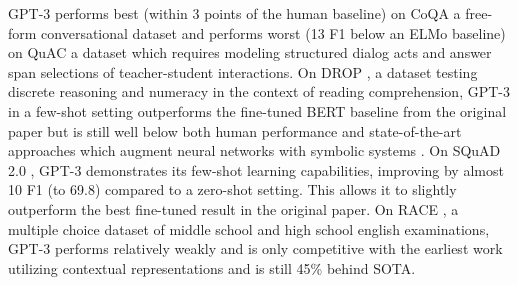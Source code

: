 \documentclass{article}
\begin{document}
GPT-3 performs best (within 3 points of the human baseline) on CoQA \cite{reddy2019coqa} a free-form conversational dataset and performs worst (13 F1 below an ELMo baseline) on QuAC \cite{choi2018quac} a dataset which requires modeling structured dialog acts and answer span selections of teacher-student interactions. On DROP \cite{dua2019drop}, a dataset testing discrete reasoning and numeracy in the context of reading comprehension, GPT-3 in a few-shot setting outperforms the fine-tuned BERT baseline from the original paper but is still well below both human performance and state-of-the-art approaches which augment neural networks with symbolic systems \cite{ran2019numnet}. On SQuAD 2.0 \cite{rajpurkar2018know}, GPT-3 demonstrates its few-shot learning capabilities, improving by almost 10 F1 (to 69.8) compared to a zero-shot setting. This allows it to slightly outperform the best fine-tuned result in the original paper. On RACE \cite{lai2017race}, a multiple choice dataset of middle school and high school english examinations, GPT-3 performs relatively weakly and is only competitive with the earliest work utilizing contextual representations and is still 45\% behind SOTA.
\end{document}
